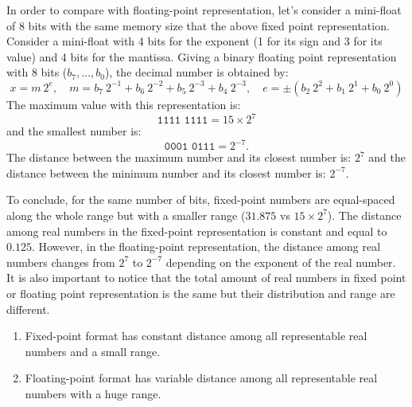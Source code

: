 

In order to compare with floating-point representation,
let's consider a mini-float of 8 bits with the same memory size that 
the above fixed point representation. 
Consider a mini-float with
4 bits for the exponent (1 for its sign and 3 for its value) and 4  bits for the mantissa.
Giving a binary floating point representation with 8 bits ($b_7, \ldots, b_0$), 
the decimal number is obtained by: 
$$
   x = m \ 2^e, \quad m =  b_7 \ 2^{-1}  + b_6 \ 2^{-2} + b_5 \ 2^{-3} + b_4 \ 2^{-3}, \quad 
    e =  \pm (  b_2 \ 2^{2} + b_1 \ 2^{1} + b_0 \ 2^{0} ) 
$$
The maximum value with this representation is: 
$$
   \texttt{1111 1111} = 15 \times 2^{7}
$$   
and the smallest number is: 
$$
   \texttt{0001 0111} =  2^{-7}.
$$ 
The distance between the maximum number and its closest  number is:  $  2^{7}$
and the distance between the minimum number and its closest number is:  
$ 2^{-7}.$





To conclude, for the same number of bits, fixed-point numbers are equal-spaced along 
the whole range but with a smaller range ($31.875$ vs $ 15 \times 2^{7}$).
The distance among real numbers in the fixed-point representation is constant and equal to $0.125$. 
However, in the floating-point representation, the distance among real numbers 
changes from $ 2^7$ to $ 2^{-7}$ depending on the exponent of the real number. 
It is also important to notice that the total amount of real numbers in fixed point or floating point 
representation is the same but their distribution and range are different.


\begin{IN}
\begin{enumerate}
\item Fixed-point format has constant distance among all representable real numbers and a small range. 
\item Floating-point format has variable distance among all representable real numbers with a huge range.  
\end{enumerate}
\end{IN}

